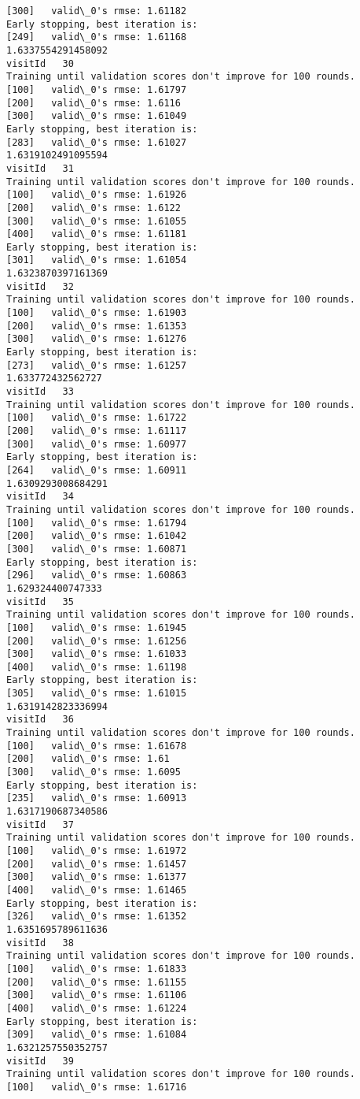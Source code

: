 \documentclass[11pt]{article}
\begin{document}
\begin{Verbatim}[commandchars=\\\{\}]
[300]	valid\_0's rmse: 1.61182
Early stopping, best iteration is:
[249]	valid\_0's rmse: 1.61168
1.6337554291458092
visitId   30
Training until validation scores don't improve for 100 rounds.
[100]	valid\_0's rmse: 1.61797
[200]	valid\_0's rmse: 1.6116
[300]	valid\_0's rmse: 1.61049
Early stopping, best iteration is:
[283]	valid\_0's rmse: 1.61027
1.6319102491095594
visitId   31
Training until validation scores don't improve for 100 rounds.
[100]	valid\_0's rmse: 1.61926
[200]	valid\_0's rmse: 1.6122
[300]	valid\_0's rmse: 1.61055
[400]	valid\_0's rmse: 1.61181
Early stopping, best iteration is:
[301]	valid\_0's rmse: 1.61054
1.6323870397161369
visitId   32
Training until validation scores don't improve for 100 rounds.
[100]	valid\_0's rmse: 1.61903
[200]	valid\_0's rmse: 1.61353
[300]	valid\_0's rmse: 1.61276
Early stopping, best iteration is:
[273]	valid\_0's rmse: 1.61257
1.633772432562727
visitId   33
Training until validation scores don't improve for 100 rounds.
[100]	valid\_0's rmse: 1.61722
[200]	valid\_0's rmse: 1.61117
[300]	valid\_0's rmse: 1.60977
Early stopping, best iteration is:
[264]	valid\_0's rmse: 1.60911
1.6309293008684291
visitId   34
Training until validation scores don't improve for 100 rounds.
[100]	valid\_0's rmse: 1.61794
[200]	valid\_0's rmse: 1.61042
[300]	valid\_0's rmse: 1.60871
Early stopping, best iteration is:
[296]	valid\_0's rmse: 1.60863
1.629324400747333
visitId   35
Training until validation scores don't improve for 100 rounds.
[100]	valid\_0's rmse: 1.61945
[200]	valid\_0's rmse: 1.61256
[300]	valid\_0's rmse: 1.61033
[400]	valid\_0's rmse: 1.61198
Early stopping, best iteration is:
[305]	valid\_0's rmse: 1.61015
1.6319142823336994
visitId   36
Training until validation scores don't improve for 100 rounds.
[100]	valid\_0's rmse: 1.61678
[200]	valid\_0's rmse: 1.61
[300]	valid\_0's rmse: 1.6095
Early stopping, best iteration is:
[235]	valid\_0's rmse: 1.60913
1.6317190687340586
visitId   37
Training until validation scores don't improve for 100 rounds.
[100]	valid\_0's rmse: 1.61972
[200]	valid\_0's rmse: 1.61457
[300]	valid\_0's rmse: 1.61377
[400]	valid\_0's rmse: 1.61465
Early stopping, best iteration is:
[326]	valid\_0's rmse: 1.61352
1.6351695789611636
visitId   38
Training until validation scores don't improve for 100 rounds.
[100]	valid\_0's rmse: 1.61833
[200]	valid\_0's rmse: 1.61155
[300]	valid\_0's rmse: 1.61106
[400]	valid\_0's rmse: 1.61224
Early stopping, best iteration is:
[309]	valid\_0's rmse: 1.61084
1.6321257550352757
visitId   39
Training until validation scores don't improve for 100 rounds.
[100]	valid\_0's rmse: 1.61716

\end{Verbatim}
\end{document}
